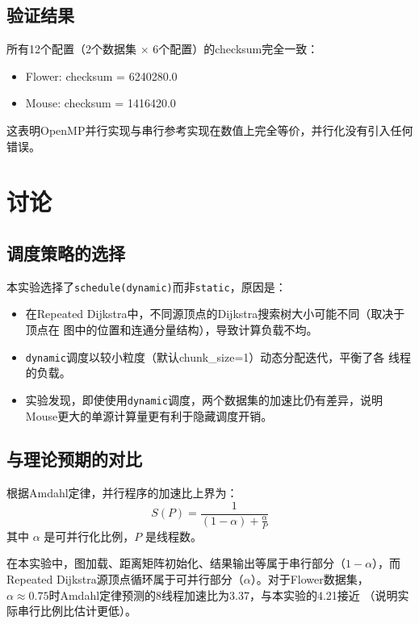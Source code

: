 \documentclass[UTF8,a4paper,12pt,fontset=none]{ctexart}
\begin{document}
\subsection{验证结果}

所有12个配置（2个数据集 $\times$ 6个配置）的checksum完全一致：
\begin{itemize}
  \item Flower: checksum = 6240280.0
  \item Mouse: checksum = 1416420.0
\end{itemize}

这表明OpenMP并行实现与串行参考实现在数值上完全等价，并行化没有引入任何错误。

\section{讨论}

\subsection{调度策略的选择}

本实验选择了\texttt{schedule(dynamic)}而非\texttt{static}，原因是：

\begin{itemize}
  \item 在Repeated Dijkstra中，不同源顶点的Dijkstra搜索树大小可能不同（取决于顶点在
        图中的位置和连通分量结构），导致计算负载不均。
  \item \texttt{dynamic}调度以较小粒度（默认chunk\_size=1）动态分配迭代，平衡了各
        线程的负载。
  \item 实验发现，即使使用\texttt{dynamic}调度，两个数据集的加速比仍有差异，说明
        Mouse更大的单源计算量更有利于隐藏调度开销。
\end{itemize}

\subsection{与理论预期的对比}

根据Amdahl定律，并行程序的加速比上界为：
\begin{equation}
  S(P) = \frac{1}{(1 - \alpha) + \frac{\alpha}{P}}
\end{equation}
其中 $\alpha$ 是可并行化比例，$P$ 是线程数。

在本实验中，图加载、距离矩阵初始化、结果输出等属于串行部分（$1 - \alpha$），而
Repeated Dijkstra源顶点循环属于可并行部分（$\alpha$）。对于Flower数据集，
$\alpha \approx 0.75$时Amdahl定律预测的8线程加速比为3.37，与本实验的4.21接近
（说明实际串行比例比估计更低）。
\end{document}
